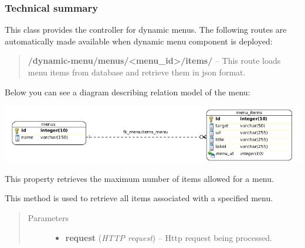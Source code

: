 \documentclass[letterpaper,10pt,english]{sphinxmanual}
\begin{document}
\subsubsection{Technical summary}
\label{features/components/dynamic_menu/dynamic_menu:technical-summary}

\begin{fulllineitems}
\label{features/components/dynamic_menu/dynamic_menu:fantastico.contrib.dynamic_menu.menu_controller.DynamicMenuController}
This class provides the controller for dynamic menus. The following routes are automatically made available
when dynamic menu component is deployed:
\begin{quote}

\textbf{/dynamic-menu/menus/\textless{}menu\_id\textgreater{}/items/} -- This route loads menu items from database and retrieve them in json format.
\end{quote}

Below you can see a diagram describing relation model of the menu:

\includegraphics{erd.png}

\begin{fulllineitems}
\label{features/components/dynamic_menu/dynamic_menu:fantastico.contrib.dynamic_menu.menu_controller.DynamicMenuController.max_items}
This property retrieves the maximum number of items allowed for a menu.

\end{fulllineitems}


\begin{fulllineitems}
\label{features/components/dynamic_menu/dynamic_menu:fantastico.contrib.dynamic_menu.menu_controller.DynamicMenuController.retrieve_menu_items}
This method is used to retrieve all items associated with a specified menu.
\begin{quote}\begin{description}
\item[{Parameters}] \leavevmode\begin{itemize}
\item {} 
\textbf{request} (\emph{HTTP request}) -- Http request being processed.


\end{itemize}
\end{description}
\end{quote}
\end{fulllineitems}
\end{fulllineitems}
\end{document}
